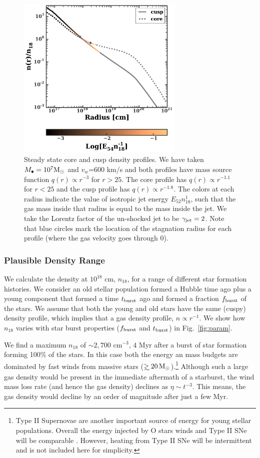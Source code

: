 \documentclass[usenatbib,fleqn]{mnras}
\newcommand\gsim{\mathrel{\rlap{\lower4pt\hbox{\hskip1pt$\sim$}}
    \raise1pt\hbox{$>$}}}
\newcommand{\Mbh}[1][]{M_{\bullet#1}}
\newcommand{\Msun}{{\rm M_\odot}}
\begin{document}
\begin{figure}
\includegraphics[width=8cm]{sedov_radius.pdf}
\caption{\label{fig:profiles} Steady state core and cusp density
  profiles. We have taken $\Mbh=10^{7} \Msun$ and $v_w$=600 km/s and
  both profiles have mass source function $q(r) \propto
  r^{-3}$ for $r > 25$. The core profile has $q(r) \propto
  r^{-1.1}$ for $r < 25$ and the cusp profile has $q(r)
  \propto r^{-1.8}$.  The colors at each radius indicate the value of
  isotropic jet energy $E_{52} n_{18}^{1}$, such that the gas mass
  inside that radius is equal to the mass inside the jet. We take the
  Lorentz factor of the un-shocked jet to be $\gamma_{\rm jet}=2$.
  Note that blue circles mark the location of the stagnation radius
      for each profile (where the gas velocity goes through 0).}
\end{figure}



\subsubsection{Plausible Density Range}
\label{sec:densAllowed}

We calculate the density at $10^{18}$ cm, $n_{18}$, for a range of
different star formation histories. We consider an old stellar
population formed a Hubble time ago plus a young component that formed
a time $t_{\rm burst}$ ago and formed a fraction $f_{\rm burst}$ of
the stars. We assume that both the young and old stars have the same
(cuspy) density profile, which implies that a gas density profile,
$n\propto r^{-1}$. We show how $n_{18}$ varies with star burst
properties ($f_{\rm burst}$ and $t_{\rm burst}$) in
Fig.~\ref{fig:param}.

We find a maximum $n_{18}$ of $\sim 2,700$ cm$^{-3}$, $4$ Myr
after a burst of star formation forming 100\% of the stars. In
this case both the energy an mass budgets are dominated by fast winds
from massive stars ($\gsim 20 \, \Msun$).\footnote{Type II Supernovae
  are another important source of energy for young stellar
  populations. Overall the energy injected by O stars winds and Type
  II SNe will be comparable \citep{Voss+2009}. However, heating from
  Type II SNe will be intermittent and is not included here for
  simplicity.}  Although such a large gas density would be present in
the immediate aftermath of a starburst, the wind mass loss rate (and
hence the gas density) declines as $\eta \sim t^{-3}$. This means, the
gas density would decline by an order of magnitude after just a few
Myr.
\end{document}
